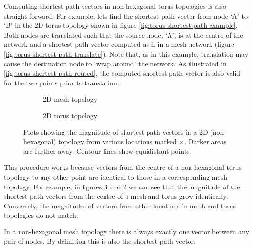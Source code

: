 			Computing shortest path vectors in non-hexagonal torus topologies is also
			straight forward. For example, lets find the shortest path vector from
			node `A' to `B' in the 2D torus topology shown in figure
			\ref{fig:torus-shortest-path-example}. Both nodes are translated such
			that the source node, `A', is at the centre of the network and a shortest
			path vector computed as if in a mesh network (figure
			\ref{fig:torus-shortest-path-translate}). Note that, as in this example,
			translation may cause the destination node to `wrap around' the network.
			As illustrated in \ref{fig:torus-shortest-path-routed}, the computed
			shortest path vector is also valid for the two points prior to
			translation.
			
			\begin{figure}
				\center
				
				\begin{subfigure}{\linewidth}
					\center
					\caption{2D mesh topology}
					\label{fig:distance-map-mesh}
				\end{subfigure}
				
				\vspace{1em}
				
				\begin{subfigure}{\linewidth}
					\center
					\caption{2D torus topology}
					\label{fig:distance-map-torus}
				\end{subfigure}
				
				\caption{Plots showing the magnitude of shortest path vectors in a 2D
				(non-hexagonal) topology from various locations marked
				{\color{red}$\times$}.  Darker areas are further away. Contour lines show
				equidistant points.}
				
				\label{fig:distance-map-mesh}
			\end{figure}
			
			This procedure works because vectors from the centre of a non-hexagonal
			torus topology to any other point are identical to those in a
			corresponding mesh topology. For example, in figures
			\ref{fig:distance-map-mesh} and \ref{fig:distance-map-torus} we can see
			that the magnitude of the shortest path vectors from the centre of a mesh
			and torus grow identically. Conversely, the magnitudes of vectors from
			other locations in mesh and torus topologies do not match.
			
			In a non-hexagonal mesh topology there is always exactly one vector
			between any pair of nodes. By definition this is also the shortest path
			vector.
		
